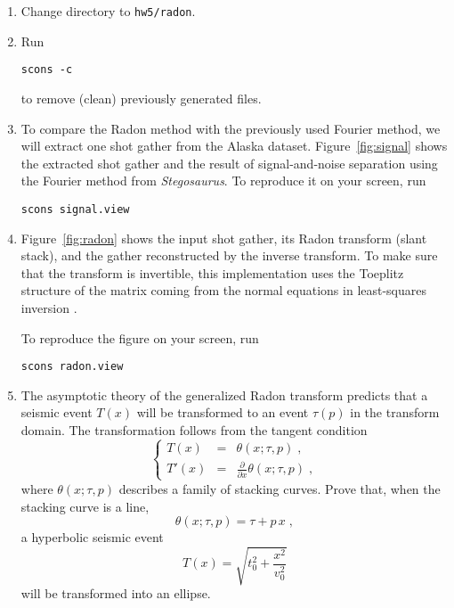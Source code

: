 \begin{enumerate}

\item Change directory to \texttt{hw5/radon}.
\item Run
\begin{verbatim}
scons -c
\end{verbatim}
to remove (clean) previously generated files.


\item To compare the Radon method with the previously used Fourier
  method, we will extract one shot gather from the Alaska
  dataset. Figure~\ref{fig:signal} shows the extracted shot gather and
  the result of signal-and-noise separation using the Fourier method from \emph{Stegosaurus}. To reproduce it on your screen, run
\begin{verbatim}
scons signal.view
\end{verbatim}


\item Figure~\ref{fig:radon} shows the input shot gather, its Radon transform (slant stack), and the gather reconstructed by the inverse transform. To make sure that the transform is invertible, this implementation uses the Toeplitz structure of the matrix coming from the normal equations in least-squares inversion \cite[]{SEG-1990-1618}.

To reproduce the figure on your screen, run
\begin{verbatim}
scons radon.view
\end{verbatim}

\item The asymptotic theory of the generalized Radon transform predicts that a seismic event $T(x)$ will be transformed to an event $\tau(p)$ in the transform domain. The transformation follows from the tangent condition
\begin{equation}
\label{eq:tangent}
\left\{\begin{array}{rcl} T(x) & = & \theta(x;\tau,p)\;, \\
T'(x) & = & \displaystyle \frac{\partial}{\partial x} \theta(x;\tau,p)\;,
\end{array}\right.
\end{equation}
where $\theta(x;\tau,p)$ describes a family of stacking curves. Prove that, when the stacking curve is a line,
\begin{equation}
\label{eq:radon}
\theta(x;\tau,p) = \tau + p\,x\;,
\end{equation}
a hyperbolic seismic event
\begin{equation}
\label{eq:hyperbola}
T(x) = \displaystyle \sqrt{t_0^2 + \frac{x^2}{v_0^2}}
\end{equation}
will be transformed into an ellipse.


\end{enumerate}
